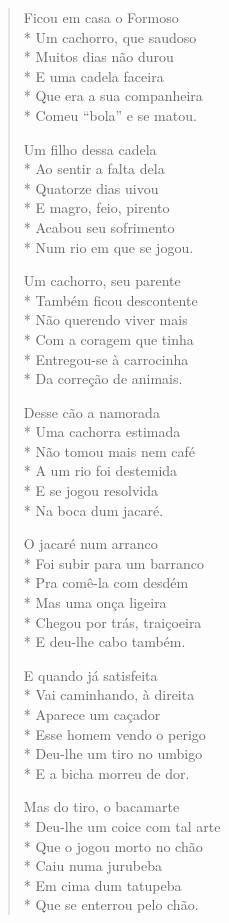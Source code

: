 \begin{verse}
Ficou em casa o Formoso\\*
Um cachorro, que saudoso\\*
Muitos dias não durou\\*
E uma cadela faceira\\*
Que era a sua companheira\\*
Comeu “bola” e se matou.

Um filho dessa cadela\\*
Ao sentir a falta dela\\*
Quatorze dias uivou\\*
E magro, feio, pirento\\*
Acabou seu sofrimento\\*
Num rio em que se jogou.

Um cachorro, seu parente\\*
Também ficou descontente\\*
Não querendo viver mais\\*
Com a coragem que tinha\\*
Entregou-se à carrocinha\\*
Da correção de animais.

Desse cão a namorada\\*
Uma cachorra estimada\\*
Não tomou mais nem café\\*
A um rio foi destemida\\*
E se jogou resolvida\\*
Na boca dum jacaré.

O jacaré num arranco\\*
Foi subir para um barranco\\*
Pra comê-la com desdém\\*
Mas uma onça ligeira\\*
Chegou por trás, traiçoeira\\*
E deu-lhe cabo também.

E quando já satisfeita\\*
Vai caminhando, à direita\\*
Aparece um caçador\\*
Esse homem vendo o perigo\\*
Deu-lhe um tiro no umbigo\\*
E a bicha morreu de dor.

Mas do tiro, o bacamarte\\*
Deu-lhe um coice com tal arte\\*
Que o jogou morto no chão\\*
Caiu numa jurubeba\\*
Em cima dum tatupeba\\*
Que se enterrou pelo chão.


\end{verse}
